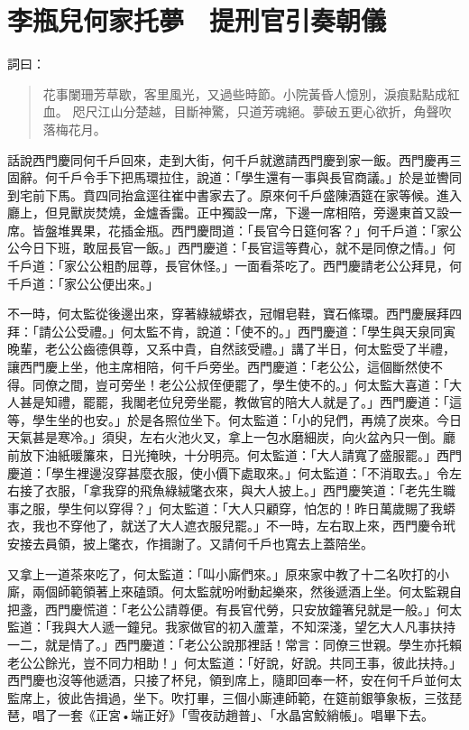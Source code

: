 
\chapter{李瓶兒何家托夢　提刑官引奏朝儀}

詞曰：
\begin{quote}
花事闌珊芳草歇，客里風光，又過些時節。小院黃昏人憶別，淚痕點點成紅血。
咫尺江山分楚越，目斷神驚，只道芳魂絕。夢破五更心欲折，角聲吹落梅花月。
\end{quote}

話說西門慶同何千戶回來，走到大街，何千戶就邀請西門慶到家一飯。西門慶再三固辭。何千戶令手下把馬環拉住，說道：「學生還有一事與長官商議。」於是並轡同到宅前下馬。賁四同抬盒逕往崔中書家去了。原來何千戶盛陳酒筵在家等候。進入廳上，但見獸炭焚燒，金爐香靄。正中獨設一席，下邊一席相陪，旁邊東首又設一席。皆盤堆異果，花插金瓶。西門慶問道：「長官今日筵何客？」何千戶道：「家公公今日下班，敢屈長官一飯。」西門慶道：「長官這等費心，就不是同僚之情。」何千戶道：「家公公粗酌屈尊，長官休怪。」一面看茶吃了。西門慶請老公公拜見，何千戶道：「家公公便出來。」

不一時，何太監從後邊出來，穿著綠絨蟒衣，冠帽皂鞋，寶石絛環。西門慶展拜四拜：「請公公受禮。」何太監不肯，說道：「使不的。」西門慶道：「學生與天泉同寅晚輩，老公公齒德俱尊，又系中貴，自然該受禮。」講了半日，何太監受了半禮，讓西門慶上坐，他主席相陪，何千戶旁坐。西門慶道：「老公公，這個斷然使不得。同僚之間，豈可旁坐！老公公叔侄便罷了，學生使不的。」何太監大喜道：「大人甚是知禮，罷罷，我閣老位兒旁坐罷，教做官的陪大人就是了。」西門慶道：「這等，學生坐的也安。」於是各照位坐下。何太監道：「小的兒們，再燒了炭來。今日天氣甚是寒冷。」須臾，左右火池火叉，拿上一包水磨細炭，向火盆內只一倒。廳前放下油紙暖簾來，日光掩映，十分明亮。何太監道：「大人請寬了盛服罷。」西門慶道：「學生裡邊沒穿甚麼衣服，使小價下處取來。」何太監道：「不消取去。」令左右接了衣服，「拿我穿的飛魚綠絨氅衣來，與大人披上。」西門慶笑道：「老先生職事之服，學生何以穿得？」何太監道：「大人只顧穿，怕怎的！昨日萬歲賜了我蟒衣，我也不穿他了，就送了大人遮衣服兒罷。」不一時，左右取上來，西門慶令玳安接去員領，披上氅衣，作揖謝了。又請何千戶也寬去上蓋陪坐。

又拿上一道茶來吃了，何太監道：「叫小廝們來。」原來家中教了十二名吹打的小廝，兩個師範領著上來磕頭。何太監就吩咐動起樂來，然後遞酒上坐。何太監親自把盞，西門慶慌道：「老公公請尊便。有長官代勞，只安放鐘箸兒就是一般。」何太監道：「我與大人遞一鐘兒。我家做官的初入蘆葦，不知深淺，望乞大人凡事扶持一二，就是情了。」西門慶道：「老公公說那裡話！常言：同僚三世親。學生亦托賴老公公餘光，豈不同力相助！」何太監道：「好說，好說。共同王事，彼此扶持。」西門慶也沒等他遞酒，只接了杯兒，領到席上，隨即回奉一杯，安在何千戶並何太監席上，彼此告揖過，坐下。吹打畢，三個小廝連師範，在筵前銀箏象板，三弦琵琶，唱了一套《正宮•端正好》「雪夜訪趙普」、「水晶宮鮫綃帳」。唱畢下去。


